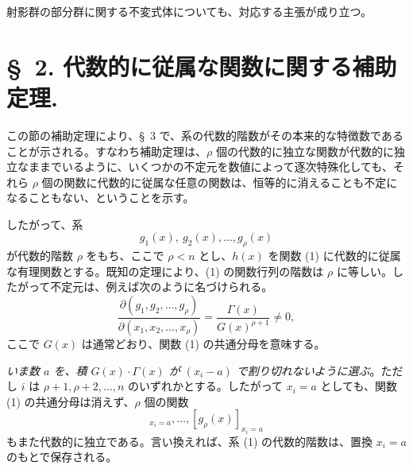 \documentclass[11pt]{article}
\begin{document}
射影群の部分群に関する不変式体についても、対応する主張が成り立つ。

\section*{\S\ 2. 代数的に従属な関数に関する補助定理.}

この節の補助定理により、\S\ 3 で、系の代数的階数がその本来的な特徴数であることが示される。すなわち補助定理は、$\rho$ 個の代数的に独立な関数が代数的に独立なままでいるように、いくつかの不定元を数値によって逐次特殊化しても、それら $\rho$ 個の関数に代数的に従属な任意の関数は、恒等的に消えることも不定になることもない、ということを示す。

したがって、系
\begin{equation}
  g_1(x),\ g_2(x),\ldots,g_\rho(x)
\tag{1}
\end{equation}
が代数的階数 $\rho$ をもち、ここで $\rho<n$ とし、$h(x)$ を関数 (1) に代数的に従属な有理関数とする。既知の定理により、(1) の関数行列の階数は $\rho$ に等しい。したがって不定元は、例えば次のように名づけられる。
\begin{equation}
 \frac{\partial(g_1,g_2,\ldots,g_\rho)}{\partial(x_1,x_2,\ldots,x_\rho)}
 =\frac{\Gamma(x)}{G(x)^{\rho+1}}\ne0,
\tag{2}
\end{equation}
ここで $G(x)$ は通常どおり、関数 (1) の共通分母を意味する。

\emph{いま数 $a$ を、積 $G(x)\cdot\Gamma(x)$ が $(x_i-a)$ で割り切れないように選ぶ}。ただし $i$ は $\rho+1,\rho+2,\ldots,n$ のいずれかとする。したがって $x_i=a$ としても、関数 (1) の共通分母は消えず、$\rho$ 個の関数
\begin{equation}
  [g_1(x)]_{x_i=a},\ldots,[g_\rho(x)]_{x_i=a}
\tag{3}
\end{equation}
もまた代数的に独立である。言い換えれば、系 (1) の代数的階数は、置換 $x_i=a$ のもとで保存される。
\end{document}
